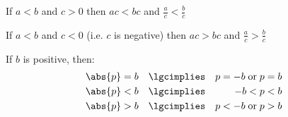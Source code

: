 \documentclass[main.tex]{subfiles}
\begin{document}
\begin{multicols}{2}
		If \(a < b\) and \(c > 0\) then \(ac < bc\) and \(\frac{a}{c} < \frac{b}{c}\)

		If \(a < b\) and \(c < 0\) (i.e. \(c\) is negative) then \(ac > bc\) and \(\frac{a}{c} > \frac{b}{c}\)

		If \(b\) is positive, then:
		\begin{align*}  %
			\abs{p} &= b &\lgcimplies && p = -b \; \text{or} \; p = b \\
			\abs{p} &< b &\lgcimplies && -b < p < b \\
			\abs{p} &> b &\lgcimplies && p < -b \; \text{or} \; p > b
		\end{align*}
	\end{multicols}
\end{document}
